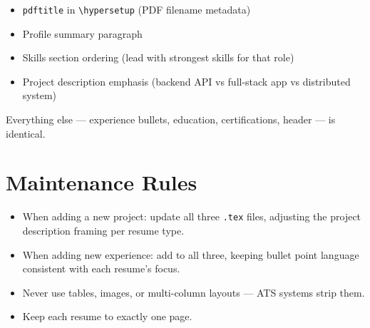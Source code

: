 \documentclass[a4paper,11pt]{article}
\begin{document}
\begin{itemize}
\item \texttt{pdftitle} in \texttt{\textbackslash hypersetup} (PDF filename metadata)
\item Profile summary paragraph
\item Skills section ordering (lead with strongest skills for that role)
\item Project description emphasis (backend API vs full-stack app vs distributed system)
\end{itemize}

Everything else --- experience bullets, education, certifications, header --- is identical.

\section*{Maintenance Rules}

\begin{itemize}
\item When adding a new project: update all three \texttt{.tex} files, adjusting the project description framing per resume type.
\item When adding new experience: add to all three, keeping bullet point language consistent with each resume's focus.
\item Never use tables, images, or multi-column layouts --- ATS systems strip them.
\item Keep each resume to exactly one page.
\end{itemize}
\end{document}
